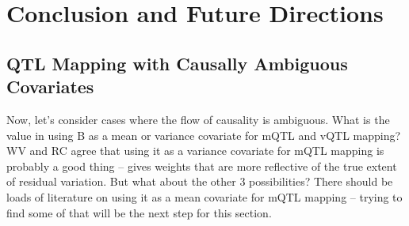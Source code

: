 \chapter{Conclusion and Future Directions}

\section{QTL Mapping with Causally Ambiguous Covariates}


Now, let's consider cases where the flow of causality is ambiguous.
What is the value in using B as a mean or variance covariate for mQTL and vQTL mapping?
WV and RC agree that using it as a variance covariate for mQTL mapping is probably a good thing -- gives weights that are more reflective of the true extent of residual variation.
But what about the other 3 possibilities?
There should be loads of literature on using it as a mean covariate for mQTL mapping -- trying to find some of that will be the next step for this section.



